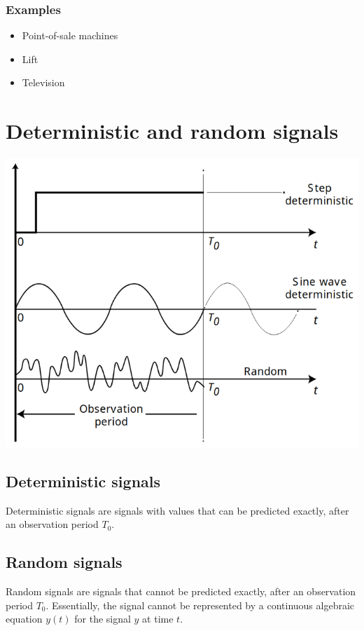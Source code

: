 \documentclass[11pt]{article}
\begin{document}
\subsubsection{Examples}
\label{sec:org274720c}
\begin{itemize}
\item Point-of-sale machines
\item Lift
\item Television
\end{itemize}

 \newpage

\section{Deterministic and random signals}
\label{sec:org4cd2a9f}
\begin{center}
\includegraphics[scale=0.9]{./images/deterministic-vs-random-signals.png}
\end{center}

\subsection{Deterministic signals}
\label{sec:orgcc56b87}
Deterministic signals are signals with values that can be predicted exactly, after an observation period \(T_0\).

\subsection{Random signals}
\label{sec:org5e64933}
Random signals are signals that cannot be predicted exactly, after an observation period \(T_0\). Essentially, the signal cannot be represented by a continuous algebraic equation \(y(t)\) for the signal \(y\) at time \(t\).
\end{document}
